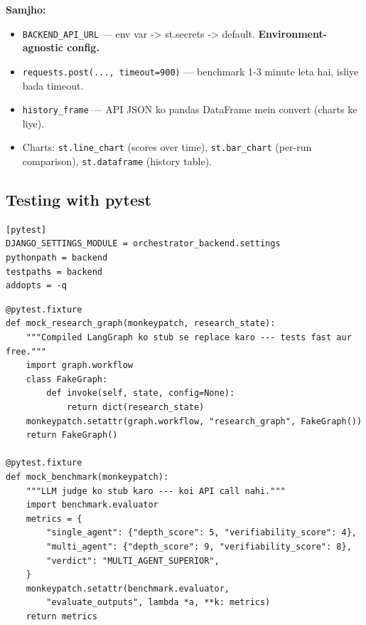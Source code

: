\documentclass[11pt, a4paper]{article}
\begin{document}
\begin{codestorybox}
\textbf{Samjho:}
\begin{itemize}
\item \texttt{BACKEND\_API\_URL} --- env var -> st.secrets -> default. \textbf{Environment-agnostic config.}
\item \texttt{requests.post(..., timeout=900)} --- benchmark 1-3 minute leta hai, isliye bada timeout.
\item \texttt{history\_frame} --- API JSON ko pandas DataFrame mein convert (charts ke liye).
\item Charts: \texttt{st.line\_chart} (scores over time), \texttt{st.bar\_chart} (per-run comparison), \texttt{st.dataframe} (history table).
\end{itemize}
\end{codestorybox}

\subsection{Testing with pytest}

\begin{lstlisting}[style=bashstyle, caption={pytest.ini}]
[pytest]
DJANGO_SETTINGS_MODULE = orchestrator_backend.settings
pythonpath = backend
testpaths = backend
addopts = -q
\end{lstlisting}

\begin{lstlisting}[style=pythonstyle, caption={backend/conftest.py --- Mocking Pipeline}]
@pytest.fixture
def mock_research_graph(monkeypatch, research_state):
    """Compiled LangGraph ko stub se replace karo --- tests fast aur free."""
    import graph.workflow
    class FakeGraph:
        def invoke(self, state, config=None):
            return dict(research_state)
    monkeypatch.setattr(graph.workflow, "research_graph", FakeGraph())
    return FakeGraph()

@pytest.fixture
def mock_benchmark(monkeypatch):
    """LLM judge ko stub karo --- koi API call nahi."""
    import benchmark.evaluator
    metrics = {
        "single_agent": {"depth_score": 5, "verifiability_score": 4},
        "multi_agent": {"depth_score": 9, "verifiability_score": 8},
        "verdict": "MULTI_AGENT_SUPERIOR",
    }
    monkeypatch.setattr(benchmark.evaluator,
        "evaluate_outputs", lambda *a, **k: metrics)
    return metrics
\end{lstlisting}
\end{document}
